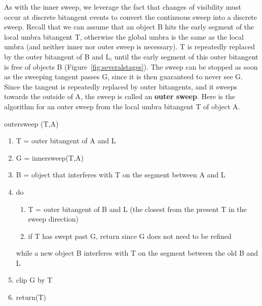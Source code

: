 \documentclass[9pt,twocolumn]{article}
\begin{document}


As with the inner sweep, we leverage the fact that changes of visibility
must occur at discrete bitangent events
to convert the continuous sweep into a discrete sweep.
Recall that we can assume that an object B hits the early segment of 
the local umbra bitangent T,
otherwise the global umbra is the same as the local umbra
(and neither inner nor outer sweep is necessary).
T is repeatedly replaced by the outer bitangent of B and L,
until the early segment of this outer bitangent is free of objects B (Figure~\ref{fig:severalstages}).
The sweep can be stopped as soon as the sweeping tangent passes G,
since it is then guaranteed to never see G.
Since the tangent is repeatedly replaced by outer
bitangents, and it sweeps towards the outside of A,
the sweep is called an {\bf outer sweep}.
Here is the algorithm for an outer sweep from the local umbra bitangent T of object A.




\vspace{.2in}

\centerline{outersweep (T,A)}

\begin{enumerate}
\item T = outer bitangent of A and L
\item G = innersweep(T,A)
\item B = object that interferes with T on the segment between A and L
\item do
\begin{enumerate}
\item T = outer bitangent of B and L (the closest from the present T in the
	sweep direction)
\item if T has swept past G, return since G does not need to be refined
\end{enumerate}
while a new object B interferes with T on the segment between the old B and L
\item clip G by T 
\item return(T)
\end{enumerate}
\end{document}
